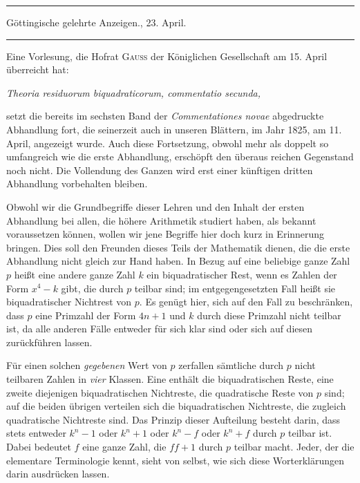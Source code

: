 \clearpage
{}
\begin{center}
\rule{.82\linewidth}{.35pt}\par
Göttingische gelehrte Anzeigen., 23. April.\par
\rule{.82\linewidth}{.35pt}
\end{center}
Eine Vorlesung, die Hofrat \textsc{Gauss} der Königlichen Gesellschaft am 15. April überreicht hat:
\begin{center}\itshape
Theoria residuorum biquadraticorum, commentatio secunda,
\end{center}
setzt die bereits im sechsten Band der \emph{Commentationes novae} abgedruckte Abhandlung fort, die seinerzeit auch in unseren Blättern, im Jahr 1825, am 11. April, angezeigt wurde. Auch diese Fortsetzung, obwohl mehr als doppelt so umfangreich wie die erste Abhandlung, erschöpft den überaus reichen Gegenstand noch nicht. Die Vollendung des Ganzen wird erst einer künftigen dritten Abhandlung vorbehalten bleiben.

Obwohl wir die Grundbegriffe dieser Lehren und den Inhalt der ersten Abhandlung bei allen, die höhere Arithmetik studiert haben, als bekannt voraussetzen können, wollen wir jene Begriffe hier doch kurz in Erinnerung bringen. Dies soll den Freunden dieses Teils der Mathematik dienen, die die erste Abhandlung nicht gleich zur Hand haben. In Bezug auf eine beliebige ganze Zahl $p$ heißt eine andere ganze Zahl $k$ ein biquadratischer Rest, wenn es Zahlen der Form $x^4-k$ gibt, die durch $p$ teilbar sind; im entgegengesetzten Fall heißt sie biquadratischer Nichtrest von $p$. Es genügt hier, sich auf den Fall zu beschränken, dass $p$ eine Primzahl der Form $4n+1$ und $k$ durch
diese Primzahl nicht teilbar ist, da alle anderen Fälle entweder für sich klar sind oder sich auf diesen zurückführen lassen.

Für einen solchen \emph{gegebenen} Wert von $p$ zerfallen sämtliche durch $p$ nicht teilbaren Zahlen in \emph{vier} Klassen. Eine enthält die biquadratischen Reste, eine zweite diejenigen biquadratischen Nichtreste, die quadratische Reste von $p$ sind; auf die beiden übrigen verteilen sich die biquadratischen Nichtreste, die zugleich quadratische Nichtreste sind. Das Prinzip dieser Aufteilung besteht darin, dass stets entweder $k^n-1$ oder $k^n+1$ oder $k^n-f$ oder $k^n+f$ durch $p$ teilbar ist. Dabei bedeutet $f$ eine ganze Zahl, die $ff+1$ durch $p$ teilbar macht. Jeder, der die elementare Terminologie kennt, sieht von selbst, wie sich diese Worterklärungen darin ausdrücken lassen.

